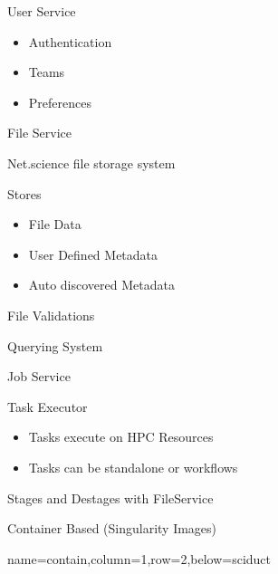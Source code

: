 \documentclass[landscape,paperwidth=70in,paperheight=46in,fontscale=0.225]{baposter} %
\begin{document}
\begin{poster}
{\noindent 
\begin{minipage}[t]{0.32\columnwidth}
User Service

\small{\begin{itemize}[leftmargin=*,noitemsep,topsep=0pt]
	\item Authentication
	\item Teams
	\item Preferences
\end{itemize}}
\end{minipage}
\hfill
\noindent
\begin{minipage}[t]{0.32\columnwidth}
File Service

\small{\begin{itemize}[leftmargin=*,noitemsep,topsep=0pt]
	\item Net.science file storage system
	\item Stores
		\tiny{
		\begin{itemize}
			\item File Data
			\item User Defined Metadata
			\item Auto discovered Metadata
		\end{itemize}}
	\small{
	\item File Validations
	\item Querying System}
\end{itemize}}

\end{minipage}
\hfill
\noindent
\begin{minipage}[t]{0.32\columnwidth}
Job Service
\small{\begin{itemize}[leftmargin=*,noitemsep,topsep=0pt]
	\item Task Executor
	\tiny{
		\begin{itemize}
			\item Tasks execute on HPC Resources
			\item Tasks can be standalone or workflows
		\end{itemize}}
	\small{
	\item Stages and Destages with FileService
	\item Container Based (Singularity Images)}

\end{itemize}}

\end{minipage}
}


          {name=contain,column=1,row=2,below=sciduct}{
          
}
\end{poster}
\end{document}
